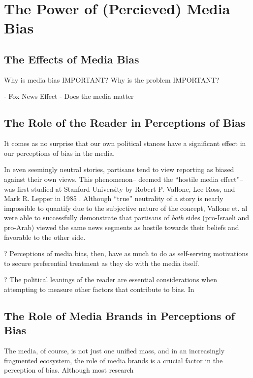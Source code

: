 \chapter{The Power of (Percieved) Media Bias}




\section{The Effects of Media Bias}

Why is media bias IMPORTANT? Why is the problem IMPORTANT?

 
- Fox News Effect
- Does the media matter


\section{The Role of the Reader in Perceptions of Bias}

It comes as no surprise that our own political stances have a significant effect in our perceptions of bias in the media. 

In even seemingly neutral stories, partisans tend to view reporting as biased against their own views. This phenomenon-- deemed the ``hostile media effect''-- was first studied at Stanford University by Robert P. Vallone, Lee Ross, and Mark R. Lepper in 1985 \cite{vallone1985hostile}. Although ``true'' neutrality of a story is nearly impossible to quantify due to the subjective nature of the concept, Vallone et. al were able to successfully demonstrate that partisans of \emph{both} sides (pro-Israeli and pro-Arab) viewed the same news segments as hostile towards their beliefs and favorable to the other side.

? Perceptions of media bias, then, have as much to do as self-serving motivations to secure preferential treatment as they do with the media itself.
  
? The political leanings of the reader are essential considerations when attempting to measure other factors that contribute to bias. In 

\section{The Role of Media Brands in Perceptions of Bias}
The media, of course, is not just one unified mass, and in an increasingly fragmented ecosystem, the role of media brands is a crucial factor in the perception of bias. Although most research
\cite{baum2008eye}








